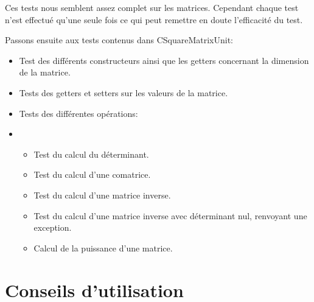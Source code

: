 		Ces tests nous semblent assez complet sur les matrices. Cependant chaque test n'est effectué qu'une seule fois ce qui peut remettre en doute l'efficacité du test.
		
		Passons ensuite aux tests contenus dans CSquareMatrixUnit:
		\begin{itemize}
			\item Test des différents constructeurs ainsi que les getters concernant la dimension de la matrice.
			\item Tests des getters et setters sur les valeurs de la matrice.
			\item Tests des différentes opérations:
			\item 
			\begin{itemize}
				\item Test du calcul du déterminant.
				\item Test du calcul d'une comatrice.
				\item Test du calcul d'une matrice inverse.
				\item Test du calcul d'une matrice inverse avec déterminant nul, renvoyant une exception.
				\item Calcul de la puissance d'une matrice.
			\end{itemize}
		\end{itemize}
	
	\chapter{Conseils d'utilisation}


